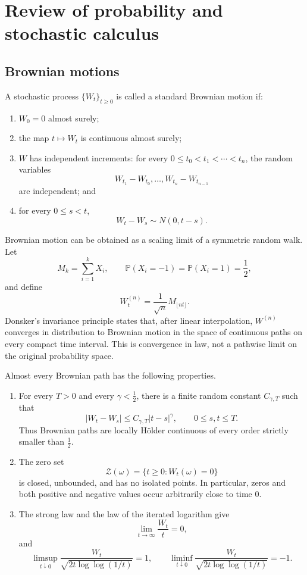 \section{Review of probability and stochastic calculus}

\subsection{Brownian motions}

\begin{de}
A stochastic process $\{W_t\}_{t\geq 0}$ is called a standard Brownian motion if:
\begin{enumerate}
    \item $W_0=0$ almost surely;
    \item the map $t\mapsto W_t$ is continuous almost surely;
    \item $W$ has independent increments: for every $0\leq t_0<t_1<\cdots<t_n$, the random variables
    \[
    W_{t_1}-W_{t_0},\ldots,W_{t_n}-W_{t_{n-1}}
    \]
    are independent; and
    \item for every $0\leq s<t$,
    \[
    W_t-W_s\sim N(0,t-s).
    \]
\end{enumerate}
\end{de}

Brownian motion can be obtained as a scaling limit of a symmetric random walk. Let
\[
M_k=\sum_{i=1}^k X_i,
\qquad
\mathbb{P}(X_i=-1)=\mathbb{P}(X_i=1)=\frac12,
\]
and define
\[
W_t^{(n)}=\frac{1}{\sqrt n}M_{\lfloor nt\rfloor}.
\]
Donsker's invariance principle states that, after linear interpolation, $W^{(n)}$ converges in distribution to Brownian motion in the space of continuous paths on every compact time interval. This is convergence in law, not a pathwise limit on the original probability space.

\begin{thm}
Almost every Brownian path has the following properties.
\begin{enumerate}
    \item For every $T>0$ and every $\gamma<\frac12$, there is a finite random constant $C_{\gamma,T}$ such that
    \[
    |W_t-W_s|\leq C_{\gamma,T}|t-s|^\gamma,
    \qquad 0\leq s,t\leq T.
    \]
    Thus Brownian paths are locally H\"older continuous of every order strictly smaller than $\frac12$.
    \item The zero set
    \[
    \mathcal{Z}(\omega)=\{t\geq 0:W_t(\omega)=0\}
    \]
    is closed, unbounded, and has no isolated points. In particular, zeros and both positive and negative values occur arbitrarily close to time $0$.
    \item The strong law and the law of the iterated logarithm give
    \[
    \lim_{t\to\infty}\frac{W_t}{t}=0,
    \]
    and
    \[
    \limsup_{t\downarrow 0}
    \frac{W_t}{\sqrt{2t\log\log(1/t)}}=1,
    \qquad
    \liminf_{t\downarrow 0}
    \frac{W_t}{\sqrt{2t\log\log(1/t)}}=-1.
    \]
\end{enumerate}
\end{thm}


